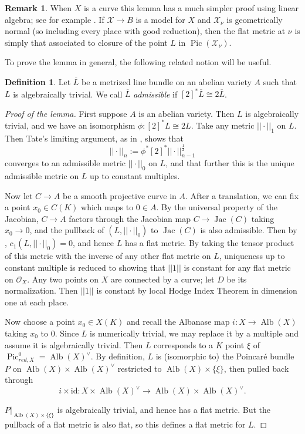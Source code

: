 \documentclass[times, doublespace]{amsart}
\numberwithin{equation}{section}
\theoremstyle{plain}
\theoremstyle{definition}
\newtheorem{definition}[equation]{Definition}
\newtheorem*{remark}{Remark}
\DeclareMathOperator{\Pic}{Pic}
\DeclareMathOperator{\Jac}{Jac}
\DeclareMathOperator{\Alb}{Alb}
\newcommand{\cO}{\mathcal{O}}
\newcommand{\cX}{\mathcal{X}}
\begin{document}
\begin{remark}
When $X$ is a curve this lemma has a much simpler proof using linear algebra; see for example \cite[Theorem 1.3]{hriljac}. If $\cX\to B$ is a model for $X$ and $\cX_{\nu}$ is geometrically normal (so including every place with good reduction), then the flat metric at $\nu$ is simply that associated to closure of the point $L$ in $\Pic(\cX_{\nu})$.
\end{remark}

To prove the lemma in general, the following related notion will be useful.
\begin{definition}
Let $\overline L$ be a metrized line bundle on an abelian variety $A$ such that $L$ is algebraically trivial. We call $\overline L$ \emph{admissible} if $[2]^*\overline L\cong 2\overline L$.
\end{definition}


\begin{proof}[Proof of the lemma]
First suppose $A$ is an abelian variety. Then $L$ is algebraically trivial, and we have an isomorphism $\phi:[2]^*L\cong2L$. Take any metric $||\cdot||_1$ on $L$. Then Tate's limiting argument, as in \cite[Theorem 2.2]{Z95}, shows that
\[||\cdot||_n:=\phi^*[2]^*||\cdot||^{\frac12}_{n-1}\]
converges to an admissible metric $||\cdot||_0$ on $L$, and that further this is the unique admissible metric on $L$ up to constant multiples. 

Now let $C\to A$ be a smooth projective curve in $A$. After a translation, we can fix a point $x_0\in C(K)$ which maps to $0\in A$. By the universal property of the Jacobian, $C\to A$ factors through the Jacobian map $C\to\Jac(C)$ taking $x_0\to0$, and the pullback of $(L,||\cdot||_0)$ to $\Jac(C)$ is also admissible. Then by \cite[Remark 3.14]{G07b}, $c_1(L,||\cdot||_0)=0$, and hence $L$ has a flat metric. By taking the tensor product of this metric with the inverse of any other flat metric on $L$, uniqueness up to constant multiple is reduced to showing that $||1||$ is constant for any flat metric on $\cO_X$. Any two points on $X$ are connected by a curve; let $D$ be its normalization. Then $||1||$ is constant by local Hodge Index Theorem in dimension one at each place.

Now choose a point $x_0\in X(K)$ and recall the Albanase map $i:X\to \Alb(X)$ taking $x_0$ to $0$. Since $L$ is numerically trivial, we may replace it by a multiple and assume it is algebraically trivial. Then $L$ corresponds to a $K$ point $\xi$ of $\Pic_{red,X}^0=\Alb(X)^{\vee}$. By definition, $L$ is (isomorphic to) the Poincar\'e bundle $P$ on $\Alb(X)\times \Alb(X)^{\vee}$ restricted to $\Alb(X)\times\{\xi\}$, then pulled back through 
\[i\times \text{id}:X\times \Alb(X)^{\vee}\longrightarrow  \Alb(X)\times \Alb(X)^{\vee}.\]

$P|_{\Alb(X)\times\{\xi\}}$ is algebraically trivial, and hence has a flat metric. But the pullback of a flat metric is also flat, so this defines a flat metric for $L$.
\end{proof}
\end{document}
